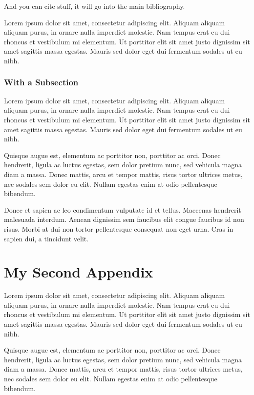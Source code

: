 \documentclass[11pt,a4paper,oneside,article]{memoir}
\begin{document}
And you can cite \cite{tobias:book} stuff, it will go into the main bibliography.

Lorem ipsum dolor sit amet, consectetur adipiscing elit. Aliquam aliquam aliquam purus, in ornare nulla imperdiet molestie. Nam tempus erat eu dui rhoncus et vestibulum mi elementum. Ut porttitor elit sit amet justo dignissim sit amet sagittis massa egestas. Mauris sed dolor eget dui fermentum sodales ut eu nibh.

\subsection{With a Subsection}

Lorem ipsum dolor sit amet, consectetur adipiscing elit. Aliquam aliquam aliquam purus, in ornare nulla imperdiet molestie. Nam tempus erat eu dui rhoncus et vestibulum mi elementum. Ut porttitor elit sit amet justo dignissim sit amet sagittis massa egestas. Mauris sed dolor eget dui fermentum sodales ut eu nibh.

Quisque augue est, elementum ac porttitor non, porttitor ac orci. Donec hendrerit, ligula ac luctus egestas, sem dolor pretium nunc, sed vehicula magna diam a massa. Donec mattis, arcu et tempor mattis, risus tortor ultrices metus, nec sodales sem dolor eu elit. Nullam egestas enim at odio pellentesque bibendum. 

Donec et sapien ac leo condimentum vulputate id et tellus. Maecenas hendrerit malesuada interdum. Aenean dignissim sem faucibus elit congue faucibus id non risus. Morbi at dui non tortor pellentesque consequat non eget urna. Cras in sapien dui, a tincidunt velit.


\clearpage %
\setcounter{page}{1} %

\chapter{My Second Appendix}\label{appx:second}

Lorem ipsum dolor sit amet, consectetur adipiscing elit. Aliquam aliquam aliquam purus, in ornare nulla imperdiet molestie. Nam tempus erat eu dui rhoncus et vestibulum mi elementum. Ut porttitor elit sit amet justo dignissim sit amet sagittis massa egestas. Mauris sed dolor eget dui fermentum sodales ut eu nibh.

Quisque augue est, elementum ac porttitor non, porttitor ac orci. Donec hendrerit, ligula ac luctus egestas, sem dolor pretium nunc, sed vehicula magna diam a massa. Donec mattis, arcu et tempor mattis, risus tortor ultrices metus, nec sodales sem dolor eu elit. Nullam egestas enim at odio pellentesque bibendum. 
\end{document}
